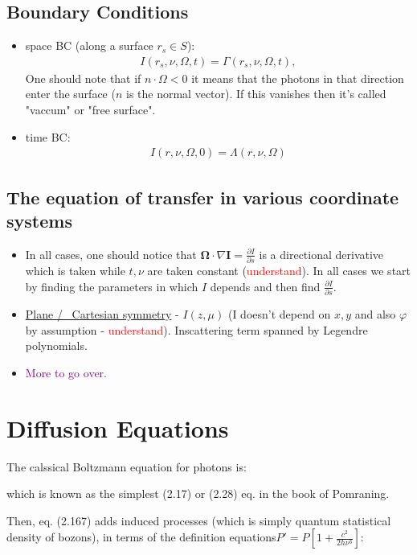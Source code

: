 \documentclass[15pt]{article}
\begin{document}
 \subsection{Boundary Conditions}
 \begin{itemize}
     \item space BC (along a surface $r_s\in S$):\begin{align}
         I(r_s,\nu,\Omega,t)=\Gamma(r_s,\nu,\Omega,t),
     \end{align}
One should note that if $n\cdot\Omega<0$ it means that the photons in that direction enter the surface ($n$ is the normal vector). If this vanishes then it's called "vaccum" or "free surface".
     \item time BC:\begin{align}
         I(r,\nu,\Omega,0)=\Lambda(r,\nu,\Omega)
     \end{align}
 \end{itemize}
\subsection{The equation of transfer in various coordinate systems}
\begin{itemize}
    \item In all cases, one should notice that $\bm\Omega\cdot\nabla\bm I=\frac{\partial I}{\partial s}$ is a directional derivative which is taken while $t,\nu$ are taken constant (\textcolor{red}{understand}). In all cases we start by finding the parameters in which $I$ depends and then find $\frac{\partial I}{\partial s}$.
    \item \underline{Plane / \ Cartesian symmetry} - $I(z,\mu)$ (I doesn't depend on $x,y$ and also $\varphi$ by assumption - \textcolor{red}{understand}). Inscattering term spanned by Legendre polynomials.
    \item \textcolor{purple}{More to go over.}
\end{itemize}

\newpage
\section{Diffusion Equations}
The calssical Boltzmann equation for photons is:



which is known as the simplest (2.17) or (2.28) eq. in the book of Pomraning.


Then, eq. (2.167) adds induced processes (which is simply quantum statistical density of bozons), in terms of the definition equations$P'=P[1 + \frac{c^2}{2h\nu^3}]$:
\end{document}
